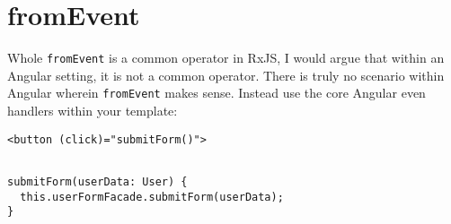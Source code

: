 \section{fromEvent}
Whole \lstinline{fromEvent} is a common operator in RxJS, I would argue that within 
an Angular setting, it is not a common operator. There is truly no scenario within 
Angular wherein \lstinline{fromEvent} makes sense. Instead use the core Angular 
even handlers within your template: 

\begin{lstlisting}[caption=user-form.input.ts]
<button (click)="submitForm()">
\end{lstlisting}

\begin{lstlisting}[caption=user-form.component.ts]

submitForm(userData: User) {
  this.userFormFacade.submitForm(userData);
}
\end{lstlisting}

